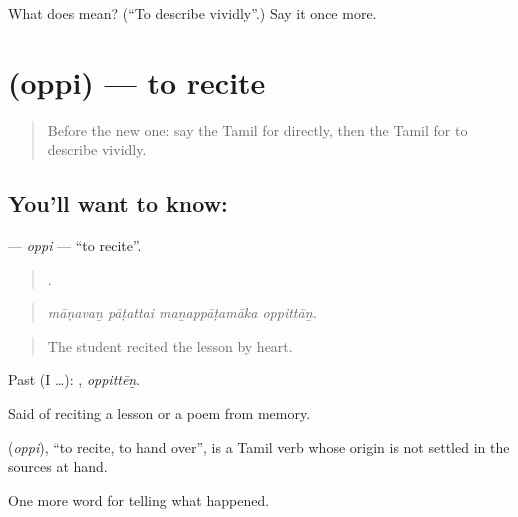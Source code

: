 \begin{tcolorbox}[breakable,colback=teal!4,colframe=teal!35!black,title={Before you move on}]
What does  mean? (\textquotedblleft{}To describe vividly\textquotedblright{}.) Say it once more.
\end{tcolorbox}
\section[\texorpdfstring{\ta{ஒப்பி} (oppi)}{ஒப்பி (oppi)}]{ (oppi) — to recite}

\label{lesson:TA-C312-oppi}



\begin{quote}
Before the new one: say the Tamil for directly, then the Tamil for to describe vividly.
\end{quote}

\subsection*{You'll want to know: }
\textbf{} — \emph{oppi} — \textquotedblleft{}to recite\textquotedblright{}.

\begin{quote}
   .
\end{quote}

\begin{quote}
\emph{māṇavaṉ pāṭattai maṉappāṭamāka oppittāṉ.}
\end{quote}

\begin{quote}
The student recited the lesson by heart.
\end{quote}

Past (I …): , \emph{oppittēṉ}.

Said of reciting a lesson or a poem from memory.

\begin{cousinweb}
\textbf{} (\emph{oppi}), \textquotedblleft{}to recite, to hand over\textquotedblright{}, is a Tamil verb whose origin is not settled in the sources at hand.
\end{cousinweb}

\begin{grammarlens}[title={What you've built}]
One more word for telling what happened.
\end{grammarlens}

